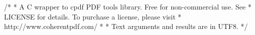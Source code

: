 /*
 * A C wrapper to cpdf PDF tools library. Free for non-commercial use. See
 * LICENSE for details. To purchase a license, please visit
 * http://www.coherentpdf.com/
 *
 * Text arguments and results are in UTF8.
 */

